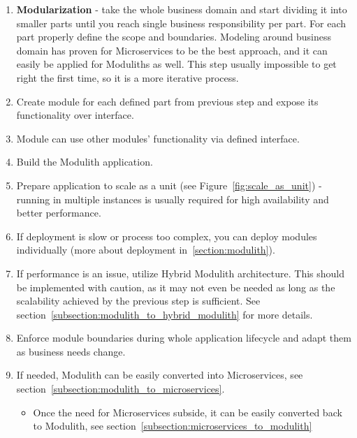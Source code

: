 \begin{enumerate}
    \item \textbf{Modularization} - take the whole business domain and start dividing it into smaller parts until you reach single business responsibility per part. For each part properly define the scope and boundaries. Modeling around business domain has proven for Microservices to be the best approach\cite{BUILDING_MS_WHAT_ARE}, and it can easily be applied for Moduliths as well. This step usually impossible to get right the first time, so it is a more iterative process.
    \item Create module for each defined part from previous step and expose its functionality over interface.
    \item Module can use other modules' functionality via defined interface.
    \item Build the Modulith application.
    \item Prepare application to scale as a unit (see Figure~\ref{fig:scale_as_unit}) - running in multiple instances is usually required for high availability and better performance.
    \item If deployment is slow or process too complex, you can deploy modules individually (more about deployment in~\ref{section:modulith}).
    \item If performance is an issue, utilize Hybrid Modulith architecture. This should be implemented with caution, as it may not even be needed as long as the scalability achieved by the previous step is sufficient. See section~\ref{subsection:modulith_to_hybrid_modulith} for more details.
        
    \item Enforce module boundaries during whole application lifecycle and adapt them as business needs change.
    \item If needed, Modulith can be easily converted into Microservices, see section~\ref{subsection:modulith_to_microservices}.
    \begin{itemize}
        \item Once the need for Microservices subside, it can be easily converted back to Modulith, see section~\ref{subsection:microservices_to_modulith}
    \end{itemize}
\end{enumerate}

